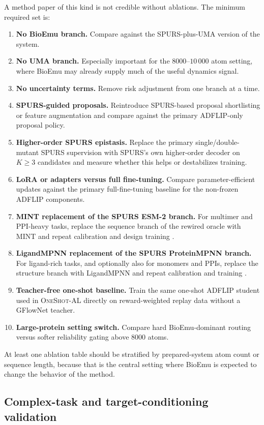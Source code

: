 \documentclass[11pt]{article}
\newcommand{\methodIII}{\textsc{OneShot-AL}}
\begin{document}
A method paper of this kind is not credible without ablations. The minimum required set is:
\begin{enumerate}[leftmargin=1.5em]
    \item \textbf{No BioEmu branch.} Compare against the SPURS-plus-UMA version of the system.
    \item \textbf{No UMA branch.} Especially important for the $8000$--$10\,000$ atom setting, where BioEmu may already supply much of the useful dynamics signal.
    \item \textbf{No uncertainty terms.} Remove risk adjustment from one branch at a time.
    \item \textbf{SPURS-guided proposals.} Reintroduce SPURS-based proposal shortlisting or feature augmentation and compare against the primary ADFLIP-only proposal policy.
    \item \textbf{Higher-order SPURS epistasis.} Replace the primary single/double-mutant SPURS supervision with SPURS's own higher-order decoder on $K\ge 3$ candidates and measure whether this helps or destabilizes training.
    \item \textbf{LoRA or adapters versus full fine-tuning.} Compare parameter-efficient updates against the primary full-fine-tuning baseline for the non-frozen ADFLIP components.
    \item \textbf{MINT replacement of the SPURS ESM-2 branch.} For multimer and PPI-heavy tasks, replace the sequence branch of the rewired oracle with MINT and repeat calibration and design training \citep{ullanat2025mint}.
    \item \textbf{LigandMPNN replacement of the SPURS ProteinMPNN branch.} For ligand-rich tasks, and optionally also for monomers and PPIs, replace the structure branch with LigandMPNN and repeat calibration and training \citep{dauparas2025ligandmpnn}.
    \item \textbf{Teacher-free one-shot baseline.} Train the same one-shot ADFLIP student used in \methodIII{} directly on reward-weighted replay data without a GFlowNet teacher.
    \item \textbf{Large-protein setting switch.} Compare hard BioEmu-dominant routing versus softer reliability gating above $8000$ atoms.
\end{enumerate}
At least one ablation table should be stratified by prepared-system atom count or sequence length, because that is the central setting where BioEmu is expected to change the behavior of the method.


\subsection{Complex-task and target-conditioning validation}
\end{document}
